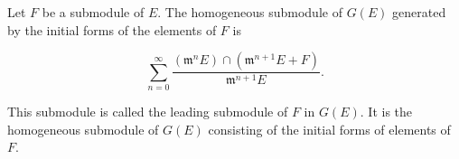 Let $F$ be a submodule of $E$. The homogeneous submodule of $G(E)$ generated by the initial forms of the elements of $F$ is

$$\sum_{n=0}^{\infty} \frac{(\mathfrak{m}^n E) \cap (\mathfrak{m}^{n+1} E + F)}{\mathfrak{m}^{n+1} E}.$$

This submodule is called the leading submodule of $F$ in $G(E)$. It is the homogeneous submodule of $G(E)$ consisting of the initial forms of elements of $F$.